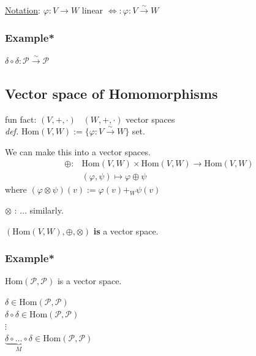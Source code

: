 \underline{Notation}: $\varphi : V \to W$ linear $\Longleftrightarrow : \varphi : V \xrightarrow{ \sim } W$


\subsubsection{Example*} $\delta \circ \delta : \mathcal{P} \xrightarrow{ \sim } \mathcal{P}$

\subsection{Vector space of Homomorphisms}

fun fact: $(V,+,\cdot)$ \, $(W,+,\cdot)$ vector spaces \\
\qquad \emph{def.} $\text{Hom}(V,W) := \lbrace \varphi : V \xrightarrow{ \sim } W \rbrace$  \qquad set.

We can make this into a vector spaces. 
\[
\begin{aligned}
\oplus  :  &  \text{Hom}(V,W) \times \text{Hom}(V,W) \to \text{Hom}(V,W) \\ 
& (\varphi, \psi) \mapsto \varphi \oplus \psi
\end{aligned}
\]
where $(\varphi \otimes \psi )(v) := \varphi(v) +_W \psi(v)$

$\otimes$ : $\dots$ similarly.  

$(\text{Hom}(V,W), \oplus, \otimes)$ \textbf{is} a vector space.

\subsubsection{Example*} $\text{Hom}(\mathcal{P},\mathcal{P})$ is a vector space.

$\delta \in \text{Hom}(\mathcal{P},\mathcal{P})$ \\
$\delta \circ \delta \in \text{Hom}(\mathcal{P},\mathcal{P})$ \\
$\vdots$ \\
$\underbrace{ \delta \circ \dots \circ \delta }_{ M} \in \text{Hom}(\mathcal{P}, \mathcal{P})$

